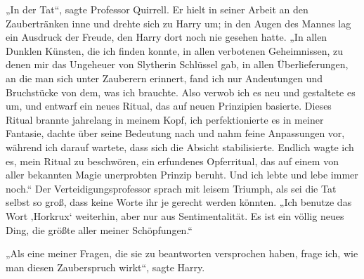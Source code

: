 „In der Tat“, sagte Professor Quirrell.
Er hielt in seiner Arbeit an den Zaubertränken inne und drehte sich zu Harry um; in den Augen des Mannes lag ein Ausdruck der Freude, den Harry dort noch nie gesehen hatte.
„In allen Dunklen Künsten, die ich finden konnte, in allen verbotenen Geheimnissen, zu denen mir das Ungeheuer von Slytherin Schlüssel gab, in allen Überlieferungen, an die man sich unter Zauberern erinnert, fand ich nur Andeutungen und Bruchstücke von dem, was ich brauchte. Also verwob ich es neu und gestaltete es um, und entwarf ein neues Ritual, das auf neuen Prinzipien basierte. Dieses Ritual brannte jahrelang in meinem Kopf, ich perfektionierte es in meiner Fantasie, dachte über seine Bedeutung nach und nahm feine Anpassungen vor, während ich darauf wartete, dass sich die Absicht stabilisierte. Endlich wagte ich es, mein Ritual zu beschwören, ein erfundenes Opferritual, das auf einem von aller bekannten Magie unerprobten Prinzip beruht. Und ich lebte und lebe immer noch.“
Der Verteidigungsprofessor sprach mit leisem Triumph, als sei die Tat selbst so groß, dass keine Worte ihr je gerecht werden könnten.
„Ich benutze das Wort ‚Horkrux‘ weiterhin, aber nur aus Sentimentalität. Es ist ein völlig neues Ding, die größte aller meiner Schöpfungen.“

„Als eine meiner Fragen, die sie zu beantworten versprochen haben, frage ich, wie man diesen Zauberspruch wirkt“, sagte Harry.

